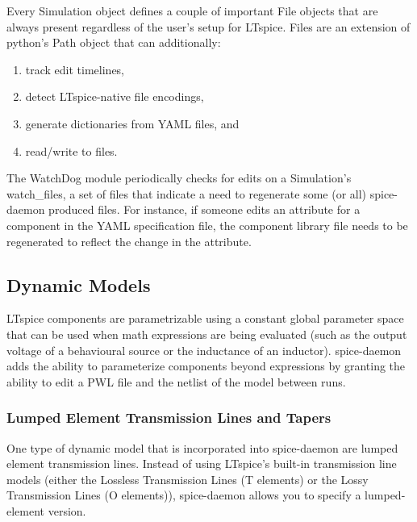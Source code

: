 \documentclass{article}
\newcommand{\cf}[1]{\textsf{#1}}
\begin{document}
Every \cf{Simulation} object defines a couple of important \cf{File} objects that are always present regardless
of the user's setup for LTspice. \cf{File}s are an extension of python's \cf{Path} object that can additionally:
\begin{enumerate}
    \item track edit timelines,
    \item detect LTspice-native file encodings,
    \item generate dictionaries from YAML files, and
    \item read/write to files.
\end{enumerate}

The \cf{WatchDog} module periodically checks for edits on a \cf{Simulation}'s \cf{watch\_files},
a set of files that indicate a need to regenerate some (or all) spice-daemon produced files.
For instance, if someone edits an attribute for a component in the YAML specification file, 
the component library file needs to be regenerated to reflect the change in the attribute.




\subsection{Dynamic Models}

LTspice components are parametrizable using a constant global parameter space that can be used when
math expressions are being evaluated (such as the output voltage of a behavioural source or the inductance 
of an inductor). spice-daemon adds the ability to parameterize components beyond expressions by granting the
ability to edit a PWL file and the netlist of the model between runs.

\subsubsection{Lumped Element Transmission Lines and Tapers}

One type of dynamic model that is incorporated into spice-daemon are lumped 
element transmission lines. Instead of using LTspice's built-in transmission
line models (either the Lossless Transmission Lines (T elements) or the 
Lossy Transmission Lines (O elements)), spice-daemon allows you to specify a
lumped-element version. 
\end{document}

